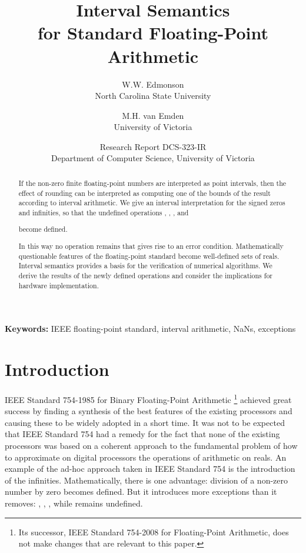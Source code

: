 \documentclass[11pt]{article}
\begin{document}
\title{Interval Semantics\\for Standard Floating-Point Arithmetic}


\date{}

\author{W.W. Edmonson \\ North Carolina State University
        \and
        M.H. van Emden \\ University of Victoria
}
\date{\small{
        Research Report DCS-323-IR \\
        Department of Computer Science, University of Victoria
      }
}

\maketitle

\begin{abstract}
If the non-zero finite floating-point numbers are interpreted as point
intervals, then the effect of rounding can be interpreted as computing
one of the bounds of the result according to interval arithmetic.
We give an interval interpretation for the signed zeros and infinities,
so that the undefined operations ,
, 
, 
and

become defined.

In this way no operation remains that gives rise to an error
condition.
Mathematically questionable features of the floating-point standard
become well-defined sets of reals.
Interval semantics provides a basis for the verification of
numerical algorithms.
We derive the results of the newly defined operations
and consider the implications for hardware implementation.


\end{abstract}

{\bf Keywords:} IEEE floating-point standard, interval arithmetic, 
NaNs, exceptions

\section{Introduction}
IEEE Standard 754-1985 for Binary Floating-Point Arithmetic
\cite{Std754}\footnote{Its successor, IEEE Standard 754-2008 for
  Floating-Point Arithmetic\cite{Std754R}, does not make changes that are
  relevant to this paper.} achieved great success by finding a
synthesis of the best features of the existing processors and causing
these to be widely adopted in a short time.  It was not to be expected
that IEEE Standard 754 had a remedy for the fact that none of the
existing processors was based on a coherent approach to the
fundamental problem of how to approximate on digital processors the
operations of arithmetic on reals.  An example of the ad-hoc approach
taken in IEEE Standard 754 is the introduction of the infinities.
Mathematically, there is one advantage: division of a non-zero number
by zero becomes defined.  But it introduces more exceptions than it
removes: , , , while  remains undefined.
\end{document}
